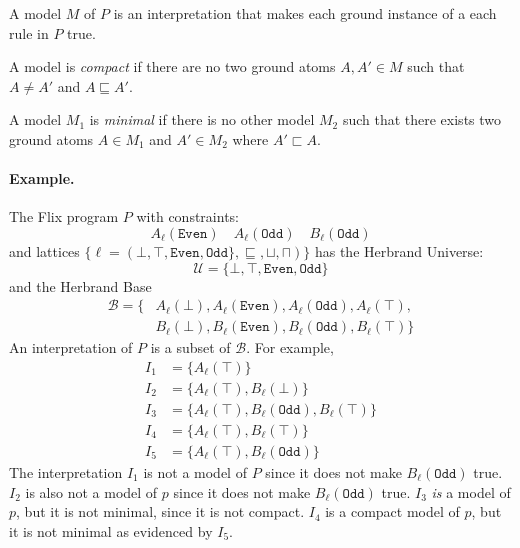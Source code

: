 \documentclass[10pt,twocolumn]{article}
\begin{document}
A model $M$ of $P$ is an interpretation that makes each ground instance of a each rule in $P$ true.

A model is \emph{compact} if there are no two ground atoms $A, A' \in M$ such that $A \neq A'$ and $A \sqsubseteq A'$.

A model $M_1$ is \emph{minimal} if there is no other model $M_2$ 
such that there exists two ground atoms $A \in M_1$ and $A' \in M_2$ where $A' \sqsubset A$.

\paragraph{Example.}
The Flix program $P$ with constraints:
\[
    A_\ell(\texttt{Even}) \quad A_\ell(\texttt{Odd}) \quad B_\ell(\texttt{Odd})
\]
and lattices $\{ \ell = (\bot, \top, \texttt{Even}, \texttt{Odd}\}, \sqsubseteq, \sqcup, \sqcap) \}$ has
the Herbrand Universe:
%
\[
    \mathcal{U} = \{\bot, \top, \texttt{Even}, \texttt{Odd}\}
\]
%
and the Herbrand Base 
%
\begin{align*}
    \mathcal{B} = \{ & A_\ell(\bot), A_\ell(\texttt{Even}), A_\ell(\texttt{Odd}), A_\ell(\top), \\
                     & B_\ell(\bot), B_\ell(\texttt{Even}), B_\ell(\texttt{Odd}), B_\ell(\top) \}
\end{align*}
%
An interpretation of $P$ is a subset of $\mathcal{B}$.
For example,
%
\begin{align*}
    I_1 & = \{ A_\ell(\top) \} \\
    I_2 & = \{ A_\ell(\top), B_\ell(\bot) \} \\
    I_3 & = \{ A_\ell(\top), B_\ell(\texttt{Odd}), B_\ell(\top) \} \\
    I_4 & = \{ A_\ell(\top), B_\ell(\top) \} \\
    I_5 & = \{ A_\ell(\top), B_\ell(\texttt{Odd}) \}
\end{align*}
%
The interpretation 
$I_1$ is not a model of $P$ since it does not make $B_\ell(\texttt{Odd})$ true.
$I_2$ is also not a model of $p$ since it does not make $B_\ell(\texttt{Odd})$ true.
$I_3$ \emph{is} a model of $p$, but it is not minimal, since it is not compact.
$I_4$ is a compact model of $p$, but it is not minimal as evidenced by $I_5$. 




\end{document}
